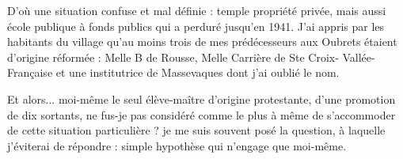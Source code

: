 D’où une situation confuse et mal définie : temple propriété privée, mais aussi école
publique à fonds publics qui a perduré jusqu’en 1941.
J’ai appris par les habitants du village qu’au moins trois de mes prédécesseurs aux
Oubrets étaient d’origine réformée : Melle B de Rousse, Melle Carrière de Ste Croix-
Vallée- Française et une institutrice de Massevaques dont j’ai oublié le nom.

Et alors... moi-même le seul élève-maître d’origine protestante, d’une promotion de
dix sortants, ne fus-je pas considéré comme le plus à même de s’accommoder de cette
situation particulière ? je me suis souvent posé la question, à laquelle j’éviterai de
répondre : simple hypothèse qui n’engage que moi-même.
